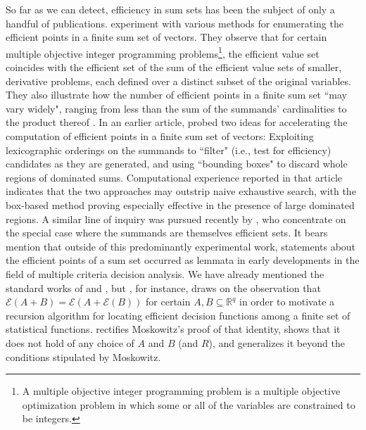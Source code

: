\documentclass[pdflatex,sn-apa,11pt]{sn-jnl}%
\begin{document}
 
    
So far as we can detect, efficiency in sum sets has been the subject of only a handful of publications. \cite{klamroth2024efficient} experiment with various methods for enumerating the efficient points in a finite sum set of vectors. They observe that for certain multiple objective integer programming problems\footnote{A multiple objective integer programming problem is a multiple objective optimization problem in which some or all of the variables are constrained to be integers.}, the efficient value set coincides with the efficient set of the sum of the efficient value sets of smaller, derivative problems, each defined over a distinct subset of the original variables. They also illustrate how the number of efficient points in a finite sum set ``may vary widely", ranging from less than the sum of the summands' cardinalities to the product thereof \cite[Lemma 2]{klamroth2024efficient}. In an earlier article, \cite{kerberenes2023computing} probed two ideas for accelerating the computation of efficient points in a finite sum set of vectors: Exploiting lexicographic orderings on the summands to ``filter" (i.e., test for efficiency) candidates as they are generated, and using ``bounding boxes" to discard whole regions of dominated sums. Computational experience reported in that article indicates that the two approaches may outstrip naive exhaustive search, with the box-based method proving especially effective in the presence of large dominated regions. A similar line of inquiry was pursued recently by \cite{funke2025pareto}, who concentrate on the special case where the summands are themselves efficient sets. It bears mention that outside of this predominantly experimental work, statements about the efficient points of a sum set occurred as lemmata in early developments in the field of multiple criteria decision analysis. We have already mentioned the standard works of \cite{yu1985multiple} and \cite{ehrgott2005multicriteria}, but \cite{moskowitz1975recursion}, for instance, draws on the observation that $\mathscr{E}(A + B) = \mathscr{E}(A + \mathscr{E}(B))$ for certain $A, B \subseteq \mathbb{R}^{q}$ in order to motivate a recursion algorithm for locating efficient decision functions among a finite set of statistical functions. \cite{white1980generalized} rectifies Moskowitz's proof of that identity, shows that it does not hold of any choice of $A$ and $B$ (and $R$), and generalizes it beyond the conditions stipulated by Moskowitz.    

\end{document}
